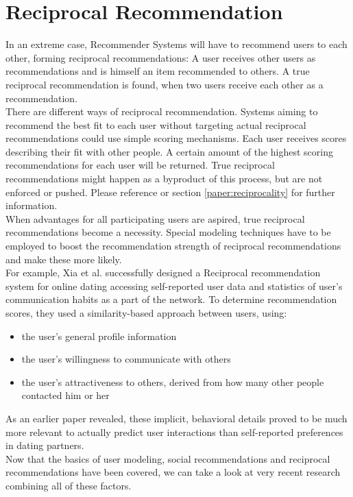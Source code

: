 \documentclass[nochapterpage,bigchapter,linedtoc,longdoc,colorback,accentcolor=tud3b,oneside]{tudreport}
\begin{document}
\section{Reciprocal Recommendation}\label{rw:reciprocalrec}
In an extreme case, Recommender Systems will have to recommend users to each other, forming reciprocal recommendations: A user receives other users as recommendations and is himself an item recommended to others. A true reciprocal recommendation is found, when two users receive each other as a recommendation.\\
There are different ways of reciprocal recommendation. Systems aiming to recommend the best fit to each user without targeting actual reciprocal recommendations could use simple scoring mechanisms. Each user receives scores describing their fit with other people. A certain amount of the highest scoring recommendations for each user will be returned. True reciprocal recommendations might happen as a byproduct of this process, but are not enforced or pushed. Please reference \cite{potts2018reciprocal} or section \ref{paper:reciprocality} for further information.\\
When advantages for all participating users are aspired, true reciprocal recommendations become a necessity. Special modeling techniques have to be employed to boost the recommendation strength of reciprocal recommendations and make these more likely.\\
For example, Xia et al. successfully designed a Reciprocal recommendation system for online dating accessing self-reported user data and statistics of user's communication habits as a part of the network. \cite{xia2015reciprocal} To determine recommendation scores, they used a similarity-based approach between users, using:\\
\begin{itemize}
	\item the user's general profile information
	\item the user's willingness to communicate with others
	\item the user's attractiveness to others, derived from how many other people contacted him or her
\end{itemize}
As an earlier paper revealed, these implicit, behavioral details proved to be much more relevant to actually predict user interactions than self-reported preferences in dating partners. \cite{xia2014characterization}\\

Now that the basics of user modeling, social recommendations and reciprocal recommendations have been covered, we can take a look at very recent research combining all of these factors.\\
\end{document}

